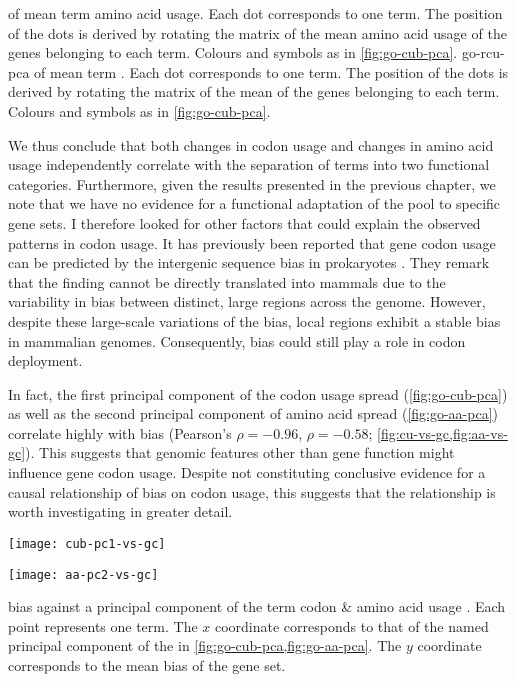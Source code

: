     {\pca of mean \go term amino acid usage.}
    {Each dot corresponds to one \go term. The position of the dots is derived
    by rotating the matrix of the mean amino acid usage of the genes belonging
    to each \go term. Colours and symbols as in \cref{fig:go-cub-pca}.}
    {go-rcu-pca}
    {\pca of mean \go term \rcu.}
    {Each dot corresponds to one \go term. The position of the dots is derived
    by rotating the matrix of the mean \rcu of the genes belonging to each \go
    term. Colours and symbols as in \cref{fig:go-cub-pca}.}

We thus conclude that both changes in codon usage and changes in amino acid
usage independently correlate with the separation of \go terms into two
functional categories. Furthermore, given the results presented in the previous
chapter, we note that we have no evidence for a functional adaptation of the
\trna pool to specific gene sets. I therefore looked for other factors that
could explain the observed patterns in codon usage. It has previously been
reported that gene codon usage can be predicted by the intergenic sequence \gc
bias in prokaryotes \citep{Chen:2004}. They remark that the finding cannot be
directly translated into mammals due to the variability in \gc bias between
distinct, large regions across the genome. However, despite these large-scale
variations of the \gc bias, local regions exhibit a stable \gc bias in mammalian
genomes. Consequently, \gc bias could still play a role in codon deployment.

In fact, the first principal component of the codon usage spread
(\cref{fig:go-cub-pca}) as well as the second principal component of amino acid
spread (\cref{fig:go-aa-pca}) correlate highly with \gc bias (Pearson’s \(\rho =
-0.96\), \(\rho = -0.58\); \cref{fig:cu-vs-gc,fig:aa-vs-gc}). This suggests that
genomic features other than gene function might influence gene codon usage.
Despite not constituting conclusive evidence for a causal relationship of \gc
bias on codon usage, this suggests that the relationship is worth investigating
in greater detail.

    {%
        \begin{minipage}{0.5\textwidth}
            \texttt{[image: cub-pc1-vs-gc]}%
        \end{minipage}%
        \begin{minipage}{0.5\textwidth}
            \texttt{[image: aa-pc2-vs-gc]}%
        \end{minipage}%
    }
    {\gc bias against a principal component of the \go term codon \& amino acid
    usage \pca.}
    {Each point represents one \go term. The \(x\) coordinate corresponds to
    that of the named principal component of the \pca in
    \cref{fig:go-cub-pca,fig:go-aa-pca}. The \(y\) coordinate corresponds to
    the mean \gc bias of the \go gene set.}

